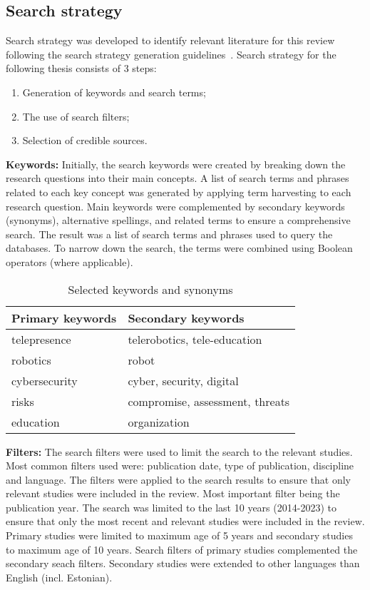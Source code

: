 \subsection{Search strategy}\label{subsec:search-strategy}

Search strategy was developed to identify relevant literature for this review following the search strategy generation guidelines~\cite[7-8]{systematic_review_2004}. Search strategy for the following thesis consists of 3 steps:

\begin{enumerate}
  \item Generation of keywords and search terms;
  \item The use of search filters;
  \item Selection of credible sources.
\end{enumerate}

\textbf{Keywords:} Initially, the search keywords were created by breaking down the research questions into their main concepts. A list
of search terms and phrases related to each key concept was generated by applying term harvesting to each research question. Main keywords
were
complemented by secondary keywords (synonyms), alternative spellings, and related terms to ensure a comprehensive search. The
result was a list of
search terms and phrases used to query the databases. To narrow down the search, the terms were combined using Boolean operators (where
applicable).

\begin{table}[h]
  \centering
  \small
  \caption{Selected keywords and synonyms}
  \label{tab:keywords}
  \begin{tabular}{|l|l|}
    \hline
    \textbf{Primary keywords} & \textbf{Secondary keywords}     \\\hline
    telepresence              & telerobotics, tele-education    \\\hline
    robotics                  & robot                           \\\hline
    cybersecurity             & cyber, security, digital        \\\hline
    risks                     & compromise, assessment, threats \\\hline
    education                 & organization                    \\\hline
  \end{tabular}
\end{table}

\textbf{Filters:} The search filters were used to limit the search to the relevant studies. Most common filters used were: publication
date, type of publication, discipline and language. The filters were applied to the search results to ensure that only relevant studies were
included in the review. Most important filter being the publication year. The search was limited to the last 10 years (2014-2023) to
ensure that only the most recent and relevant studies were included in the review. Primary studies were limited to maximum age of 5
years and secondary studies to maximum age of 10 years. Search filters of primary studies complemented the secondary seach filters.
Secondary studies were extended to other languages than English (incl. Estonian).

